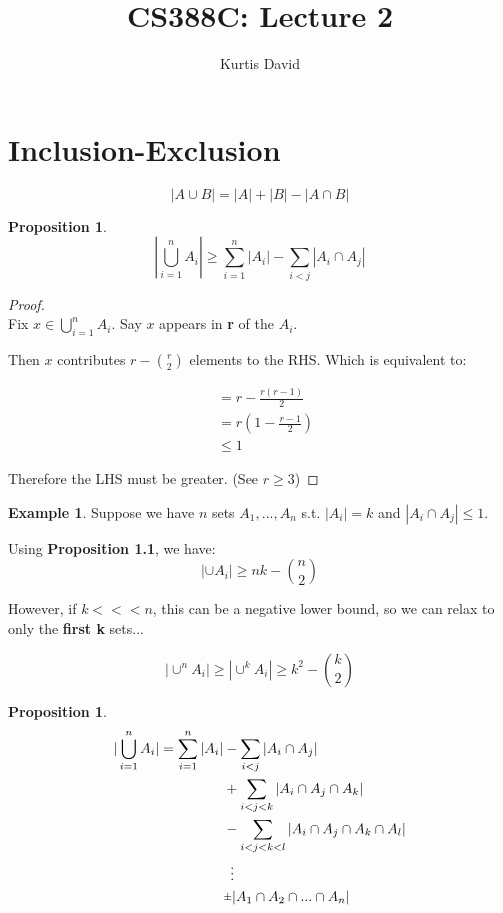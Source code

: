 \documentclass[psamsfonts, 12pt]{amsart}
\newtheorem{prop}[thm]{Proposition}
\theoremstyle{definition}
\newtheorem{exmp}[thm]{Example}
\theoremstyle{remark}
\newcommand{\rpm}{\sbox0{$1$}\sbox2{$\scriptstyle\pm$}
  \raise\dimexpr(\ht0-\ht2)/2\relax\box2 }
\begin{document}
%
\author{Kurtis David}
%
\title{CS388C: Lecture 2}
%
\maketitle
%

\section{Inclusion-Exclusion}

\begin{equation}
| A \cup B | = |A| + |B| - |A\cap B|
\end{equation}

\vspace{0.5em}
\begin{prop}
\[
|\bigcup_{i=1}^nA_i| \geq \sum_{i=1}^n|A_i| - \sum_{i<j}|A_i \cap A_j |
\]
\end{prop}

\begin{proof}
\ \\

Fix $x\in \bigcup_{i=1}^nA_i$. Say $x$ appears in \textbf{r} of the $A_i$.

Then $x$ contributes $r-{r\choose2}$ elements to the RHS. Which is equivalent to:

\begin{align*}
&= r - \frac{r(r-1)}{2}\\
&=r(1-\frac{r-1}{2})\\
&\leq 1
\end{align*}

Therefore the LHS must be greater. (See $r \geq 3$)
\end{proof}

\begin{exmp}
Suppose we have $n$ sets $A_1,...,A_n$ s.t. $|A_i| = k$ and $|A_i\cap A_j| \leq 1$.

Using \textbf{Proposition 1.1}, we have:
\[
|\cup A_i| \geq nk - {n\choose 2}
\]

However, if $k <<< n$, this can be a negative lower bound, so we can relax to only the \textbf{first k} sets...

\[
|\cup^n A_i| \geq |\cup^k A_i| \geq k^2 - {k\choose2}
\]
\end{exmp}

\begin{prop}
\begin{align*}
|\bigcup_{i=1}^nA_i| = \sum_{i=1}^n|A_i| &- \sum_{i<j}|A_i \cap A_j |\\
&+\sum_{i<j<k}|A_i \cap A_j \cap A_k |\\
&-\sum_{i<j<k<l}|A_i \cap A_j \cap A_k \cap A_l|\\
&\ \vdots\\
&\rpm |A_1 \cap A_2 \cap ... \cap A_n |
\end{align*}
\end{prop}
\end{document}
